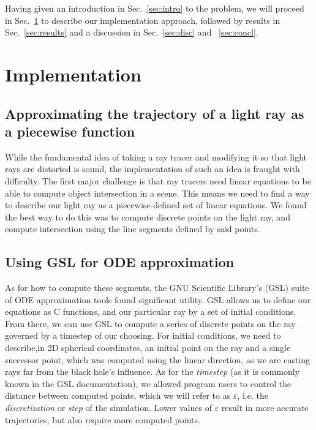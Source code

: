 Having given an introduction in Sec.~\ref{sec:intro} to the problem, we will proceed in Sec.~\ref{sec:impl} to describe our implementation approach, followed by results in  Sec.~\ref{sec:results} and a discussion in Sec.~\ref{sec:disc} and ~\ref{sec:concl}.



\section{Implementation}
\label{sec:impl}


\subsection{Approximating the trajectory of a light ray as a piecewise function}
While the fundamental idea of taking a ray tracer and modifying it so that light rays are distorted is sound, the implementation of such an idea is fraught with difficulty. The first major challenge is that ray tracers need linear equations to be able to compute object intersection in a scene. This means we need to find a way to describe our light ray as a piecewise-defined set of linear equations. We found the best way to do this was to compute discrete points on the light ray, and compute intersection using the line segments defined by said points. 


\subsection{Using GSL for ODE approximation}
As for how to compute these segments, the GNU Scientific Library's (GSL) suite \cite{10.5555/1538674} of ODE approximation tools found significant utility. GSL allows us to define our equations as C functions, and our particular ray by a set of initial conditions. From there, we can use GSL to compute a series of discrete points on the ray governed by a timestep of our choosing. For initial conditions, we need to describe,in 2D spherical coordinates, an initial point on the ray and a single successor point, which was computed using the linear direction, as we are casting rays far from the black hole's influence. As for the \textit{timestep} (as it is commonly known in the GSL documentation), we allowed program users to control the distance between computed points, which we will refer to as $\varepsilon$, i.e. the \textit{discretization} or \textit{step} of the simulation. Lower values of $\varepsilon$ result in more accurate trajectories, but also require more computed points. 

